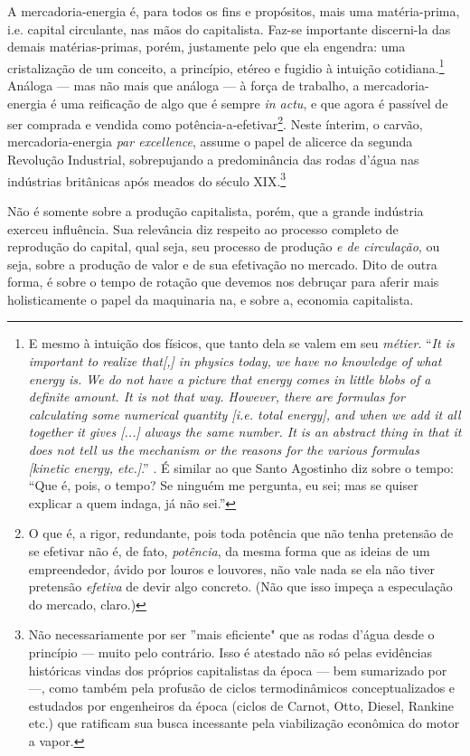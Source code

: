 \documentclass[12pt]{article}
\numberwithin{equation}{section}
\theoremstyle{plain}
\theoremstyle{definition}
\theoremstyle{remark}
\begin{document}
A mercadoria-energia é, para todos os fins e propósitos, mais uma matéria-prima, i.e. capital circulante, nas mãos do capitalista. Faz-se importante discerni-la das demais matérias-primas, porém, justamente pelo que ela engendra: uma cristalização de um conceito, a princípio, etéreo e fugidio à intuição cotidiana.\footnote{E mesmo à intuição dos físicos, que tanto dela se valem em seu \textit{métier}. ``\textit{It is important to realize that[,] in physics today, we have no knowledge of what energy is. We do not have a picture that energy comes in little blobs of a definite amount. It is not that way. However, there are formulas for calculating some numerical quantity [i.e. total energy], and when we add it all together it gives [...] always the same number. It is an abstract thing in that it does not tell us the mechanism or the reasons for the various formulas [kinetic energy, etc.]}.'' \parencite[Vol I, Cap. 4]{Feynman2006}. É similar ao que Santo Agostinho diz sobre o tempo: ``Que é, pois, o tempo? Se ninguém me pergunta, eu sei; mas se quiser explicar a quem indaga, já não sei.''} Análoga — mas não mais que análoga — à força de trabalho, a mercadoria-energia é uma reificação de algo que é sempre \textit{in actu}, e que agora é passível de ser comprada e vendida como potência-a-efetivar\footnote{O que é, a rigor, redundante, pois toda potência que não tenha pretensão de se efetivar não é, de fato, \textit{potência}, da mesma forma que as ideias de um empreendedor, ávido por louros e louvores, não vale nada se ela não tiver pretensão \textit{efetiva} de devir algo concreto. (Não que isso impeça a especulação do mercado, claro.)}. Neste ínterim, o carvão, mercadoria-energia \textit{par excellence}, assume o papel de alicerce da segunda Revolução Industrial, sobrepujando a predominância das rodas d'água nas indústrias britânicas após meados do século XIX.\footnote{Não necessariamente por ser ''mais eficiente" que as rodas d'água desde o princípio — muito pelo contrário. Isso é atestado não só pelas evidências históricas vindas dos próprios capitalistas da época — bem sumarizado por \textcite{Malm2016,Malm2013} —, como também pela profusão de ciclos termodinâmicos conceptualizados e estudados por engenheiros da época (ciclos de Carnot, Otto, Diesel, Rankine etc.) que ratificam sua busca incessante pela viabilização econômica do motor a vapor.}

Não é somente sobre a produção capitalista, porém, que a grande indústria exerceu influência. Sua relevância diz respeito ao processo completo de reprodução do capital, qual seja, seu processo de produção \textit{e de circulação}, ou seja, sobre a produção de valor e de sua efetivação no mercado. Dito de outra forma, é sobre o tempo de rotação que devemos nos debruçar para aferir mais holisticamente o papel da maquinaria na, e sobre a, economia capitalista. 
\end{document}
